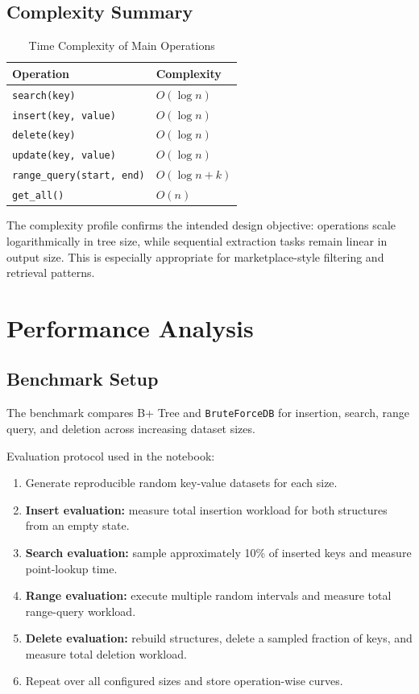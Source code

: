 \documentclass[12pt, a4paper]{article}
\begin{document}
\subsection{Complexity Summary}
\begin{table}[H]
\centering
\caption{Time Complexity of Main Operations}
\begin{tabular}{@{}ll@{}}
\toprule
Operation & Complexity \\
\midrule
\texttt{search(key)} & \(O(\log n)\) \\
\texttt{insert(key, value)} & \(O(\log n)\) \\
\texttt{delete(key)} & \(O(\log n)\) \\
\texttt{update(key, value)} & \(O(\log n)\) \\
\texttt{range\_query(start, end)} & \(O(\log n + k)\) \\
\texttt{get\_all()} & \(O(n)\) \\
\bottomrule
\end{tabular}
\end{table}

The complexity profile confirms the intended design objective: operations scale logarithmically in tree size, while sequential extraction tasks remain linear in output size. This is especially appropriate for marketplace-style filtering and retrieval patterns.

\section{Performance Analysis}
\subsection{Benchmark Setup}
The benchmark compares B+ Tree and \texttt{BruteForceDB} for insertion, search, range query, and deletion across increasing dataset sizes.

Evaluation protocol used in the notebook:
\begin{enumerate}
    \item Generate reproducible random key-value datasets for each size.
    \item \textbf{Insert evaluation:} measure total insertion workload for both structures from an empty state.
    \item \textbf{Search evaluation:} sample approximately 10\% of inserted keys and measure point-lookup time.
    \item \textbf{Range evaluation:} execute multiple random intervals and measure total range-query workload.
    \item \textbf{Delete evaluation:} rebuild structures, delete a sampled fraction of keys, and measure total deletion workload.
    \item Repeat over all configured sizes and store operation-wise curves.
\end{enumerate}
\end{document}
